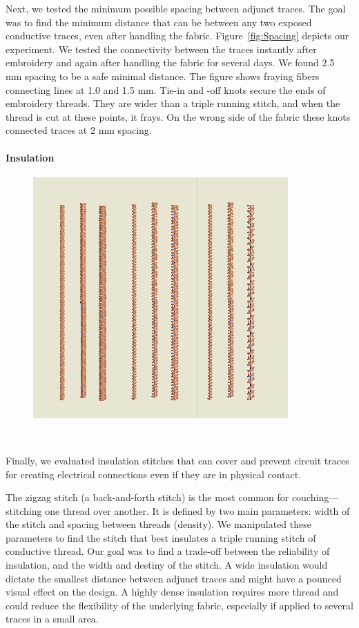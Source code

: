 \documentclass[header.tex]{subfiles}
\begin{document}
Next, we tested the minimum possible spacing between adjunct traces. The goal was to find the minimum distance that can be between any two exposed conductive traces, even after handling the fabric. Figure~\ref{fig:Spacing} depicts our experiment. We tested the connectivity between the traces instantly after embroidery and again after handling the fabric for several days. We found 2.5 mm spacing to be a safe minimal distance. The figure shows fraying fibers connecting lines at 1.0 and 1.5 mm. Tie-in and -off knots secure the ends of embroidery threads. They are wider than a triple running stitch, and when the thread is cut at these points, it frays. On the wrong side of the fabric these knots connected traces at 2 mm spacing.



\paragraph{Insulation}
\begin{figure}
\centering
  \includegraphics[width=0.7\columnwidth]{figures/Insulation}
  \caption{}~\label{fig:Insulation}
  \vspace{-2.5em}
\end{figure}
Finally, we evaluated insulation stitches that can cover and prevent circuit traces for creating electrical connections even if they are in physical contact. 

The zigzag stitch (a back-and-forth stitch) is the most common for couching---stitching one thread over another. It is defined by two main parameters: width of the stitch and spacing between threads (density). We manipulated these parameters to find the stitch that best insulates a triple running stitch of conductive thread. 
Our goal was to find a trade-off between the reliability of insulation, and the width and destiny of the stitch. A wide insulation would dictate the smallest distance between adjunct traces and might have a pounced visual effect on the design. A highly dense insulation requires more thread and could reduce the flexibility of the underlying fabric, especially if applied to several traces in a small area.
\end{document}
